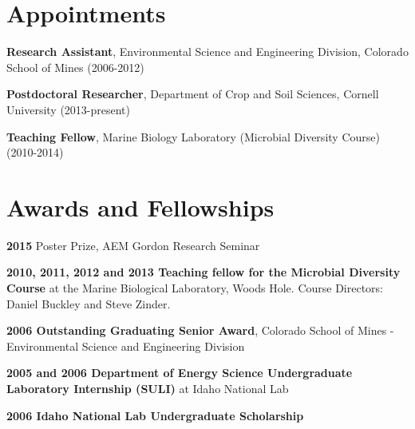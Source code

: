 \documentclass[letterpaper]{article}
\renewenvironment{itemize}{
  \begin{list}{}{
    \setlength{\leftmargin}{1.5em}
  }
}{
  \end{list}
}
\begin{document}

\section*{Appointments}
\begin{itemize}
    \item \textbf{Research Assistant}, Environmental Science and Engineering
        Division, Colorado School of Mines (2006-2012)
    \item \textbf{Postdoctoral Researcher}, Department of Crop and Soil
        Sciences, Cornell University (2013-present)
    \item \textbf{Teaching Fellow}, Marine Biology Laboratory (Microbial
        Diversity Course) (2010-2014)
\end{itemize}
\section*{Awards and Fellowships}
\begin{itemize}
    \item \textbf{2015} Poster Prize, AEM Gordon Research Seminar
    \item \textbf{2010, 2011, 2012 and 2013 Teaching fellow for the Microbial
        Diversity Course} at the Marine Biological Laboratory, Woods
        Hole.  Course Directors: Daniel Buckley and Steve Zinder.
    \item \textbf{2006 Outstanding Graduating Senior Award}, Colorado School of Mines - Environmental Science and Engineering Division
    \item \textbf{2005 and 2006 Department of Energy Science Undergraduate Laboratory Internship
        (SULI)} at Idaho National Lab
    \item \textbf{2006 Idaho National Lab Undergraduate Scholarship}
\end{itemize}
\end{document}
